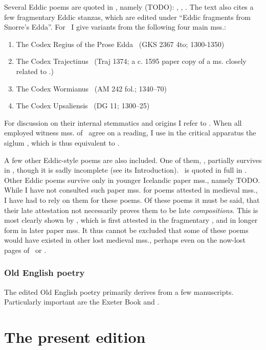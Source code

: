     Several Eddic poems are quoted in \Gylfaginning, namely (TODO): \Voluspa, \Vafthrudnismal, \Grimnismal.  The text also cites a few fragmentary Eddic stanzas, which are edited under “Eddic fragments from Snorre’s Edda”.  For \Gylfaginning\ I give variants from the following four main mss.:
    \begin{enumerate}
      \item The Codex Regius of the Prose Edda \RegiusProse\ (GKS 2367 4to; 1300-1350)
      \item The Codex Trajectinus \Trajectinus\ (Traj 1374; a c. 1595 paper copy of a ms. closely related to \RegiusProse.)
      \item The Codex Wormianus \Wormianus\ (AM 242 fol.; 1340–70)
      \item The Codex Upsaliensis \Upsaliensis\ (DG 11; 1300–25)
    \end{enumerate}

    For discussion on their internal stemmatics and origins I refer to \textcite{Haukur2017}.  When all employed witness mss. of \Gylfaginning\ agree on a reading, I use in the critical apparatus the siglum \GylfMS, which is thus equivalent to \RegiusProse\Trajectinus\Wormianus\Upsaliensis.

    A few other Eddic-style poems are also included.  One of them, \Rigsthula, partially survives in \Wormianus, though it is sadly incomplete (see its Introduction).  \Grottasongr\ is quoted in full in \Skaldskaparmal.  Other Eddic poems survive only in younger Icelandic paper mss., namely TODO.  While I have not consulted such paper mss. for poems attested in medieval mss., I have had to rely on them for these poems.  Of these poems it must be said, that their late attestation not necessarily proves them to be late \emph{compositions}.  This is most clearly shown by \Baldrsdraumar, which is first attested in the fragmentary \AM, and in longer form in later paper mss.  It thus cannot be excluded that some of these poems would have existed in other lost medieval mss., perhaps even on the now-lost pages of \Regius\ or \AM.

    \subsubsection{Old English poetry}

    The edited Old English poetry primarily derives from a few manuscripts.  Particularly important are the Exeter Book and \Lacnunga.


\section{The present edition}

